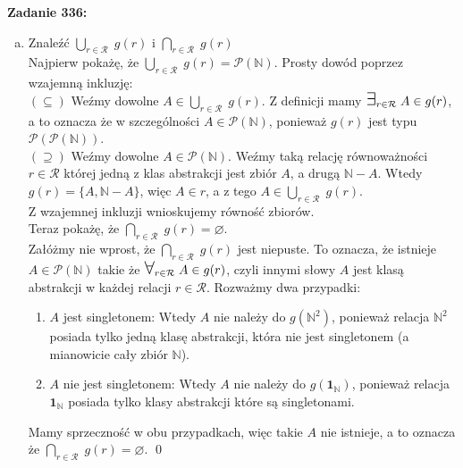 \documentclass[10pt]{article}
\newcommand{\N}{\mathbb{N}}
\newcommand{\Pows}{\mathcal{P}}
\newcommand{\Forall}{{\Large\mbox{$\forall$}}}
\newcommand{\Exists}{{\Large\mbox{$\exists$}}}
\begin{document}
\vspace{20pt}

\textbf{Zadanie 336:}
\newcommand{\Rel}{\mathcal{R}}
\begin{enumerate}[a)]
    \item Znaleźć $\displaystyle \bigcup_{r \in \Rel} \; g(r)$ i $\displaystyle \bigcap_{r \in \Rel} \; g(r)$ \\[10pt]
    Najpierw pokażę, że $\bigcup_{r \in \Rel} \; g(r) = \Pows (\N)$. Prosty dowód poprzez wzajemną inkluzję: \\[5pt]
    $(\subseteq)$ Weźmy dowolne $A \in \bigcup_{r \in \Rel} \; g(r)$. Z definicji mamy $\Exists_{r \in \Rel} \; A \in g(r)$, a to oznacza że w szczególności $A \in \Pows(\N)$, ponieważ $g(r)$ jest typu $\Pows(\Pows(\N))$. \\[5pt]
    $(\supseteq)$ Weźmy dowolne $A \in \Pows(\N)$. Weźmy taką relację równoważności $r \in \Rel$ której jedną z klas abstrakcji jest zbiór $A$, a drugą $\N - A$. Wtedy $g(r) = \{A, \N - A\}$, więc $A \in r$, a z tego $A \in \bigcup_{r \in \Rel} \; g(r)$. \\[5pt]
    Z wzajemnej inkluzji wnioskujemy równość zbiorów. \\[10pt]
    Teraz pokażę, że $\bigcap_{r \in \Rel} \; g(r) = \varnothing$. \\[5pt]
    Załóżmy nie wprost, że $\bigcap_{r \in \Rel} \; g(r)$ jest niepuste. To oznacza, że istnieje $A \in \Pows(\N)$ takie że $\Forall_{r \in \Rel} \; A \in g(r)$, czyli innymi słowy $A$ jest klasą abstrakcji w każdej relacji $r \in \Rel$. Rozważmy dwa przypadki:
    \begin{enumerate}[1)]
        \item $A$ jest singletonem: Wtedy $A$ nie należy do $g(\N^2)$, ponieważ relacja $\N^2$ posiada tylko jedną klasę abstrakcji, która nie jest singletonem (a mianowicie cały zbiór $\N$).

        \item $A$ nie jest singletonem: Wtedy $A$ nie należy do $g(\mathbf{1}_\N)$, ponieważ relacja $\mathbf{1}_\N$ posiada tylko klasy abstrakcji które są singletonami.
    \end{enumerate}
    Mamy sprzeczność w obu przypadkach, więc takie $A$ nie istnieje, a to oznacza że $\bigcap_{r \in \Rel} \; g(r) = \varnothing$. \qed


\end{enumerate}
\end{document}
